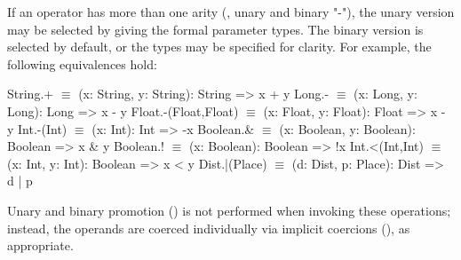 If an operator has more than one arity (\eg, unary and binary
\xcd"-"), the unary version may be selected by giving the
formal parameter types.  The binary version is selected by
default, or the types may be specified for clarity.
For example, the following equivalences hold:

\begin{xtenmath}
String.+             $\equiv$ (x: String, y: String): String => x + y
Long.-               $\equiv$ (x: Long, y: Long): Long => x - y
Float.-(Float,Float) $\equiv$ (x: Float, y: Float): Float => x - y
Int.-(Int)           $\equiv$ (x: Int): Int => -x
Boolean.&            $\equiv$ (x: Boolean, y: Boolean): Boolean => x & y
Boolean.!            $\equiv$ (x: Boolean): Boolean => !x
Int.<(Int,Int)       $\equiv$ (x: Int, y: Int): Boolean => x < y
Dist.|(Place)        $\equiv$ (d: Dist, p: Place): Dist => d | p
\end{xtenmath}



%

Unary and binary promotion () is not performed
when invoking these
operations; instead, the operands are coerced individually via implicit
coercions (), as appropriate.


